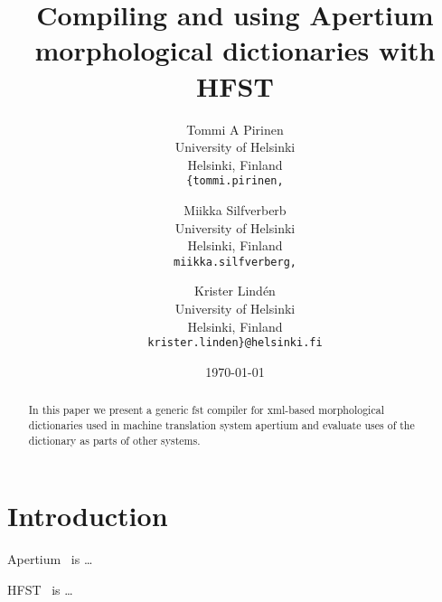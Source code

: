 \documentclass[11pt,a4paper]{article}
\title{Compiling and using Apertium morphological dictionaries with HFST}
\author{Tommi A Pirinen\\
  University of Helsinki\\
  Helsinki, Finland\\
  {\tt \{tommi.pirinen,} \and
  Miikka Silfverberb\\
  University of Helsinki\\
  Helsinki, Finland\\
  {\tt miikka.silfverberg,} \and
  Krister Lind\'{e}n\\
  University of Helsinki\\
  Helsinki, Finland\\
  {\tt krister.linden\}@helsinki.fi}
}
\date{\today}
\begin{document}
\maketitle
\begin{abstract}
    In this paper we present a generic fst compiler for xml-based morphological
dictionaries used in machine translation system apertium and evaluate uses
of the dictionary as parts of other systems.
\end{abstract}

\section{Introduction}

Apertium~\cite{} is \ldots

HFST~\cite{hfst/2011} is \ldots





\end{document}
